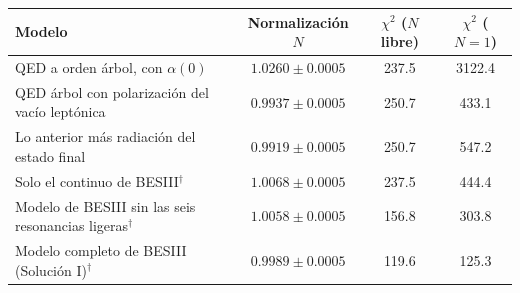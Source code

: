 \begin{tabular}{>{\raggedright\arraybackslash}p{6.4cm}ccc}
\toprule
Modelo & Normalización $N$ & $\chi^2$ ($N$ libre) & $\chi^2$ ($N=1$) \\
\midrule
QED a orden árbol, con $\alpha(0)$ & $1.0260\pm0.0005$ & 237.5 & 3122.4 \\
QED árbol con polarización del vacío leptónica & $0.9937\pm0.0005$ & 250.7 & 433.1 \\
Lo anterior más radiación del estado final & $0.9919\pm0.0005$ & 250.7 & 547.2 \\
\midrule
Solo el continuo de BESIII$^\dagger$ & $1.0068\pm0.0005$ & 237.5 & 444.4 \\
Modelo de BESIII sin las seis resonancias ligeras$^\dagger$ & $1.0058\pm0.0005$ & 156.8 & 303.8 \\
Modelo completo de BESIII (Solución I)$^\dagger$ & $0.9989\pm0.0005$ & 119.6 & 125.3 \\
\bottomrule
\end{tabular}
